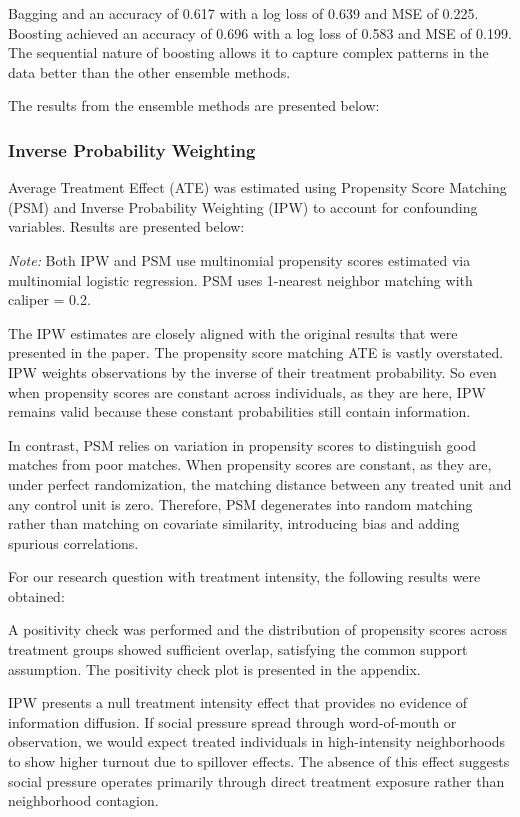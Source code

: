 \documentclass[11pt]{article}
\begin{document}
Bagging and an accuracy of 0.617 with a log loss of 0.639 and MSE of 0.225. Boosting achieved an accuracy of 0.696 with a log loss of 0.583 and MSE of 0.199. The sequential nature of boosting allows it to capture complex patterns in the data better than the other ensemble methods.

The results from the ensemble methods are presented below:


\subsubsection{Inverse Probability Weighting}
Average Treatment Effect (ATE) was estimated using Propensity Score Matching (PSM) and Inverse Probability Weighting (IPW) to account for confounding variables. Results are presented below:

\textit{Note:} Both IPW and PSM use multinomial propensity scores estimated via multinomial logistic regression. PSM uses 1-nearest neighbor matching with caliper = 0.2.


The IPW estimates are closely aligned with the original results that were presented in the paper. The propensity score matching ATE is vastly overstated. IPW weights observations by the inverse of their treatment probability. So even when propensity scores are constant across individuals, as they are here, IPW remains valid because these constant probabilities still contain information. 

In contrast, PSM relies on variation in propensity scores to distinguish good matches from poor matches. When propensity scores are constant, as they are, under perfect randomization, the matching distance between any treated unit and any control unit is zero. Therefore, PSM degenerates into random matching rather than matching on covariate similarity, introducing bias and adding spurious correlations. 

For our research question with treatment intensity, the following results were obtained:


A positivity check was performed and the distribution of propensity scores across treatment groups showed sufficient overlap, satisfying the common support assumption. The positivity check plot is presented in the appendix.

IPW presents a null treatment intensity effect that provides no evidence of information diffusion. If social pressure spread through word-of-mouth or observation, we would expect treated individuals in high-intensity neighborhoods to show higher turnout due to spillover effects. The absence of this effect suggests social pressure operates primarily through direct treatment exposure rather than neighborhood contagion.
\end{document}
